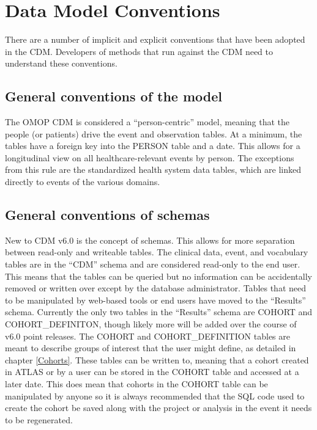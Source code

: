 \documentclass[11pt]{book}
\theoremstyle{definition}
\theoremstyle{definition}
\theoremstyle{definition}
\theoremstyle{remark}
\begin{document}
\hypertarget{data-model-conventions}{%
\section{Data Model Conventions}\label{data-model-conventions}}

There are a number of implicit and explicit conventions that have been adopted in the CDM. Developers of methods that run against the CDM need to understand these conventions.

\hypertarget{model-conv}{%
\subsection{General conventions of the model}\label{model-conv}}

The OMOP CDM is considered a ``person-centric'' model, meaning that the people (or patients) drive the event and observation tables. At a minimum, the tables have a foreign key into the PERSON table and a date. This allows for a longitudinal view on all healthcare-relevant events by person. The exceptions from this rule are the standardized health system data tables, which are linked directly to events of the various domains.

\hypertarget{general-conventions-of-schemas}{%
\subsection{General conventions of schemas}\label{general-conventions-of-schemas}}

New to CDM v6.0 is the concept of schemas. This allows for more separation between read-only and writeable tables. The clinical data, event, and vocabulary tables are in the ``CDM'' schema and are considered read-only to the end user. This means that the tables can be queried but no information can be accidentally removed or written over except by the database administrator. Tables that need to be manipulated by web-based tools or end users have moved to the ``Results'' schema. Currently the only two tables in the ``Results'' schema are COHORT and COHORT\_DEFINITON, though likely more will be added over the course of v6.0 point releases. The COHORT and COHORT\_DEFINITION tables are meant to describe groups of interest that the user might define, as detailed in chapter \ref{Cohorts}. These tables can be written to, meaning that a cohort created in ATLAS or by a user can be stored in the COHORT table and accessed at a later date. This does mean that cohorts in the COHORT table can be manipulated by anyone so it is always recommended that the SQL code used to create the cohort be saved along with the project or analysis in the event it needs to be regenerated.
\end{document}
